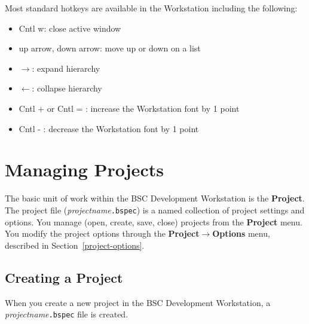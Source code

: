 \documentclass{article}
\newcommand{\te}[1]{\texttt{#1}}
\begin{document}
Most standard hotkeys are available in the Workstation including the
following:
\begin{itemize}
\item Cntl w: close active window
\item up arrow, down arrow: move up or down on a list
\item $\rightarrow$: expand hierarchy
\item $\leftarrow$: collapse hierarchy
\item Cntl + or Cntl = : increase the Workstation font by 1 point
\item Cntl - : decrease the Workstation font by 1 point
\end{itemize}


\section{Managing Projects}

The basic unit of work within the BSC Development Workstation is the
{\bf Project}.   The project file ({\em projectname}\te{.bspec})  is
a named collection  of project settings and options.  You manage
(open, create, save, close)
projects from the {\bf Project} menu.  You  modify the project options
through the {\bf Project$\rightarrow$Options} menu, described in
Section~\ref{project-options}.



\subsection{Creating a Project}

\label{project}
\index{.bspec@\te{.bspec}}



When you create a new project in the BSC Development Workstation,
 a {\em projectname}\te{.bspec} file is created.

\end{document}

